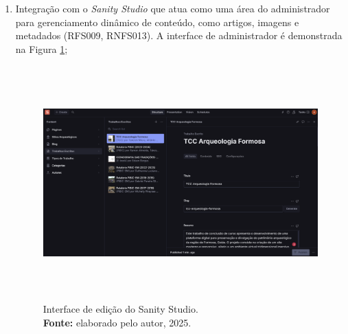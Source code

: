 \begin{enumerate}
\begin{enumerate}
            \item Integração com o \textit{Sanity Studio} que atua como uma área do administrador para gerenciamento dinâmico de conteúdo, como artigos, imagens e metadados (RFS009, RNFS013). A interface de administrador é demonstrada na Figura \ref{fig:sanity_admin};

                    \begin{figure}[H]
                        \centering
                        \includegraphics[height=9cm, keepaspectratio]{img/sanity/sanity admin.png}
                        \caption{ Interface de edição do Sanity Studio. \\
                            \textbf{Fonte:} elaborado pelo autor, 2025.}
                        \label{fig:sanity_admin}
                    \end{figure}
        

\end{enumerate}
\end{enumerate}

